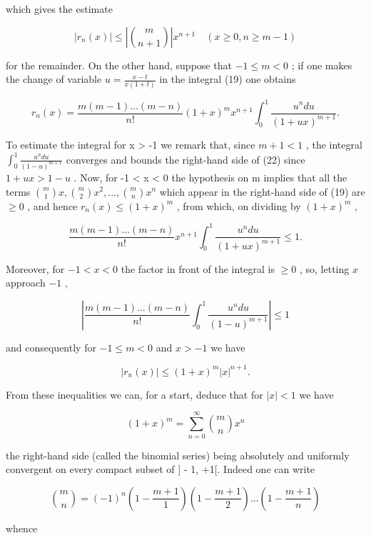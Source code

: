 which gives the estimate

\[
\left| r _ {n} (x) \right| \leqslant \left| \binom {m} {n + 1} \right| x ^ {n + 1} \quad (x \geqslant 0, n \geqslant m - 1)\tag{21}
\]

for the remainder. On the other hand, suppose that \(-1 \leqslant m < 0\) ; if one makes the change of variable \(u = \frac{x - t}{x(1 + t)}\) in the integral (19) one obtains

\[
r _ {n} (x) = \frac {m (m - 1) \dots (m - n)}{n !} (1 + x) ^ {m} x ^ {n + 1} \int_ {0} ^ {1} \frac {u ^ {n} d u}{(1 + u x) ^ {m + 1}}.\tag{22}
\]

To estimate the integral for x \textgreater{} -1 we remark that, since \(m + 1 < 1\) , the integral \(\int_{0}^{1}\frac{u^{n}du}{(1-u)^{m+1}}\) converges and bounds the right-hand side of (22) since \(1+ux > 1-u\) . Now, for -1 \textless{} x \textless{} 0 the hypothesis on m implies that all the terms \(\binom{m}{1}x,\binom{m}{2}x^{2},\ldots,\binom{m}{n}x^{n}\) which appear in the right-hand side of (19) are \(\geqslant 0\) , and hence \(r_{n}(x) \leqslant (1+x)^{m}\) , from which, on dividing by \((1+x)^{m}\) ,

\[
\frac {m (m - 1) \dots (m - n)}{n !} x ^ {n + 1} \int_ {0} ^ {1} \frac {u ^ {n} d u}{(1 + u x) ^ {m + 1}} \leqslant 1.
\]

Moreover, for \(-1 < x < 0\) the factor in front of the integral is \(\geqslant 0\) , so, letting \(x\) approach \(-1\) ,

\[
\left| \frac {m (m - 1) \dots (m - n)}{n !} \int_ {0} ^ {1} \frac {u ^ {n} d u}{(1 - u) ^ {m + 1}} \right| \leqslant 1
\]

and consequently for \(-1 \leqslant m < 0\) and \(x > -1\) we have

\[
\left| r _ {n} (x) \right| \leqslant (1 + x) ^ {m} | x | ^ {n + 1}.\tag{23}
\]

From these inequalities we can, for a start, deduce that for \(|x| < 1\) we have

\[
(1 + x) ^ {m} = \sum_ {n = 0} ^ {\infty} \binom {m} {n} x ^ {n}\tag{24}
\]

the right-hand side (called the binomial series) being absolutely and uniformly convergent on every compact subset of {]} - 1, +1{[}. Indeed one can write

\[
\binom {m} {n} = (- 1) ^ {n} \left(1 - \frac {m + 1}{1}\right) \left(1 - \frac {m + 1}{2}\right) \dots \left(1 - \frac {m + 1}{n}\right)\tag{25}
\]

whence

